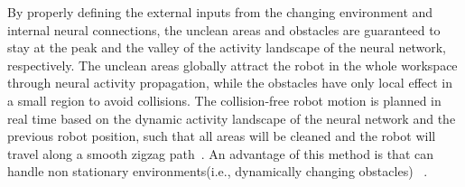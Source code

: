 By properly defining the external inputs from the changing environment and internal neural connections, the unclean areas and obstacles are guaranteed to stay at the peak and the valley of the activity landscape of the neural network, respectively. The unclean areas globally attract the robot in the whole workspace through neural activity propagation, while the obstacles have only local effect in a small region to avoid collisions. The collision-free robot motion is planned in real time based on the dynamic activity landscape of the neural network and the previous robot position, such that all areas will be cleaned and the robot will travel along a smooth zigzag path~\cite{luo_bioinspired_2008}. An advantage of this method is that can handle non stationary environments(i.e., dynamically changing obstacles)~ \cite{galceran_survey_2013}.
%
%
%
